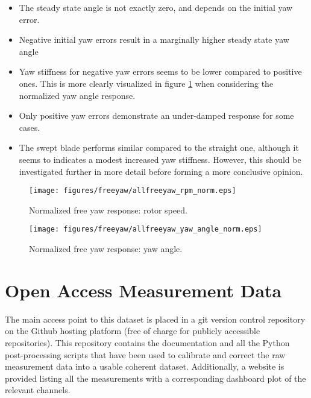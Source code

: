\documentclass[a4paper]{jpconf}
\begin{document}
\begin{itemize}
	\item The steady state angle is not exactly zero, and depends on the initial yaw error.
	\item Negative initial yaw errors result in a marginally higher steady state yaw angle
	\item Yaw stiffness for negative yaw errors seems to be lower compared to positive ones. This is more clearly visualized in figure \ref{allfreeyaw-respons-yaw-norm} when considering the normalized yaw angle response.
	\item Only positive yaw errors demonstrate an under-damped response for some cases.
	\item The swept blade performs similar compared to the straight one, although it seems to indicates a modest increased yaw stiffness. However, this should be investigated further in more detail before forming a more conclusive opinion.
\end{itemize}


\begin{figure}[h]
\begin{minipage}{\textwidth}
\centering
\texttt{[image: figures/freeyaw/allfreeyaw\_rpm\_norm.eps]}
\caption{\label{allfreeyaw-respons-rpm-norm} Normalized free yaw response: rotor speed.}
\end{minipage}
\begin{minipage}{\textwidth}
\centering
\texttt{[image: figures/freeyaw/allfreeyaw\_yaw\_angle\_norm.eps]}
\caption{\label{allfreeyaw-respons-yaw-norm} Normalized free yaw response: yaw angle.}
\end{minipage} 
\end{figure}

\section{Open Access Measurement Data}

The main access point to this dataset is placed in a git version control repository on the Github hosting platform (free of charge for publicly accessible repositories). This repository \cite{github:freeyaw-ojf-wt-tests} contains the documentation and all the Python post-processing scripts that have been used to calibrate and correct the raw measurement data into a usable coherent dataset. Additionally, a website is provided listing all the measurements with a corresponding dashboard plot of the relevant channels.
\end{document}
